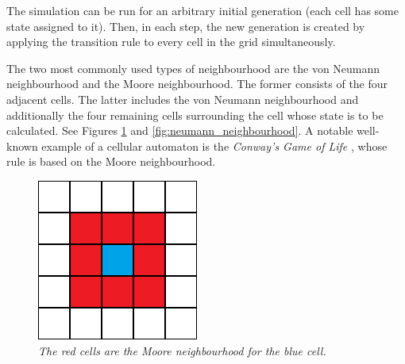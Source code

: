 \documentclass[a4paper, 11pt]{article} %
\begin{document}
The simulation can be run for an arbitrary initial generation (each cell has some state assigned to it). Then, in each step, the new generation is created by applying the transition rule to every cell in the grid simultaneously.

The two most commonly used types of neighbourhood are the von Neumann neighbourhood and the Moore neighbourhood. The former consists of the four adjacent cells. The latter includes the von Neumann neighbourhood and additionally the four remaining cells surrounding the cell whose state is to be calculated. \cite{wiki} See Figures \ref{fig:moore_neighbourhood} and \ref{fig:neumann_neighbourhood}. A notable well-known example of a cellular automaton is the \emph{Conway's Game of Life} \cite{conway}, whose rule is based on the Moore neighbourhood.

\begin{figure}[ht]
	\centering
	\begin{minipage}[t]{0.45\textwidth}
    		\includegraphics[width=\textwidth]{moore}
		\caption{\textit{The red cells are the Moore neighbourhood for the blue cell.} \cite{wiki}}
		\label{fig:moore_neighbourhood}
	\end{minipage}
	\hfill
	\begin{minipage}[t]{0.45\textwidth}

\end{minipage}
\end{figure}
\end{document}
